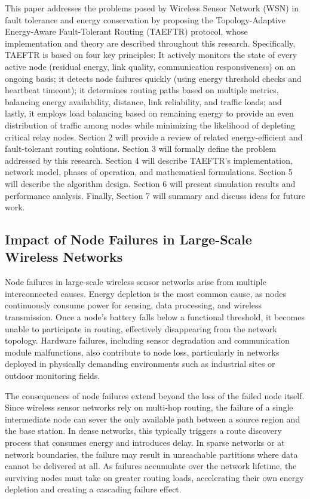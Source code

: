 \documentclass[a4paper,fleqn]{cas-dc}
\numberwithin{equation}{section}
\begin{document}
This paper addresses the problems posed by Wireless Sensor Network (WSN) in fault tolerance and energy conservation by proposing the Topology-Adaptive Energy-Aware Fault-Tolerant Routing (TAEFTR) protocol, whose implementation and theory are described throughout this research. Specifically, TAEFTR is based on four key principles: It actively monitors the state of every active node (residual energy, link quality, communication responsiveness) on an ongoing basis; it detects node failures quickly (using energy threshold checks and heartbeat timeout); it determines routing paths based on multiple metrics, balancing energy availability, distance, link reliability, and traffic loads; and lastly, it employs load balancing based on remaining energy to provide an even distribution of traffic among nodes while minimizing the likelihood of depleting critical relay nodes. Section 2 will provide a review of related energy-efficient and fault-tolerant routing solutions. Section 3 will formally define the problem addressed by this research. Section 4 will describe TAEFTR's implementation, network model, phases of operation, and mathematical formulations. Section 5 will describe the algorithm design. Section 6 will present simulation results and performance analysis. Finally, Section 7 will summary and discuss ideas for future work.
 

\subsection{Impact of Node Failures in Large-Scale Wireless Networks}

Node failures in large-scale wireless sensor networks arise from multiple interconnected causes. Energy depletion is the most common cause, as nodes continuously consume power for sensing, data processing, and wireless transmission. Once a node's battery falls below a functional threshold, it becomes unable to participate in routing, effectively disappearing from the network topology. Hardware failures, including sensor degradation and communication module malfunctions, also contribute to node loss, particularly in networks deployed in physically demanding environments such as industrial sites or outdoor monitoring fields.
 
The consequences of node failures extend beyond the loss of the failed node itself. Since wireless sensor networks rely on multi-hop routing, the failure of a single intermediate node can sever the only available path between a source region and the base station. In dense networks, this typically triggers a route discovery process that consumes energy and introduces delay. In sparse networks or at network boundaries, the failure may result in unreachable partitions where data cannot be delivered at all. As failures accumulate over the network lifetime, the surviving nodes must take on greater routing loads, accelerating their own energy depletion and creating a cascading failure effect.
\end{document}
